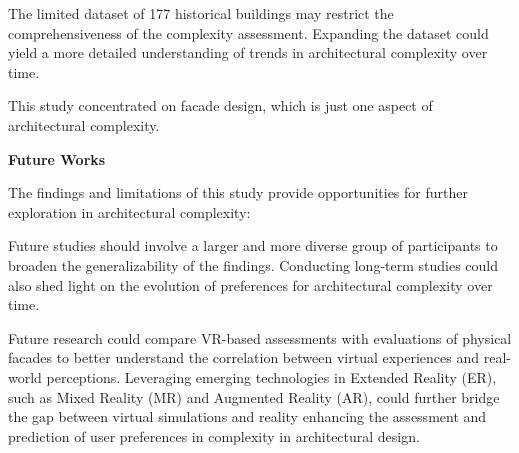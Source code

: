 
The limited dataset of 177 historical buildings may restrict the comprehensiveness of the complexity assessment.
Expanding the dataset could yield a more detailed understanding of trends in architectural complexity over time.

This study concentrated on facade design, which is just one aspect of architectural complexity.


\textbf{Future Works}

The findings and limitations of this study provide opportunities for further exploration in architectural complexity:

Future studies should involve a larger and more diverse group of participants to broaden the generalizability of the findings.
Conducting long-term studies could also shed light on the evolution of preferences for architectural complexity over time.

Future research could compare VR-based assessments with evaluations of physical facades to better understand the correlation between virtual experiences and real-world perceptions.
Leveraging emerging technologies in Extended Reality (ER), such as Mixed Reality (MR) and Augmented Reality (AR), could further bridge the gap between virtual simulations and reality enhancing the assessment and prediction of user preferences in complexity in architectural design.

